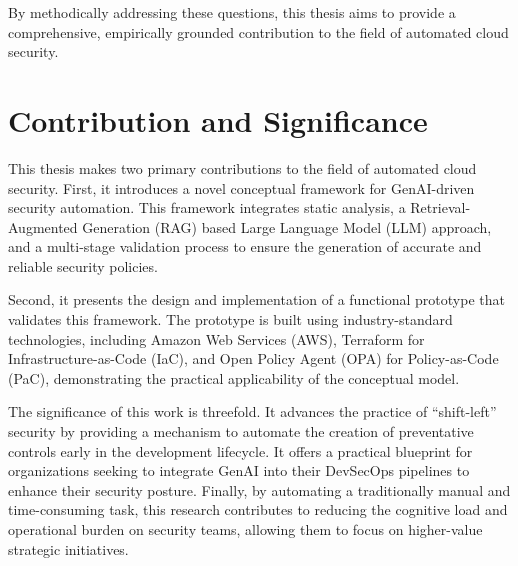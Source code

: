 By methodically addressing these questions, this thesis aims to provide a comprehensive, empirically grounded contribution to the field of automated cloud security.

\section{Contribution and Significance}
\label{sec:contribution}

This thesis makes two primary contributions to the field of automated cloud security. First, it introduces a novel conceptual framework for GenAI-driven security automation. This framework integrates static analysis, a Retrieval-Augmented Generation (RAG) based Large Language Model (LLM) approach, and a multi-stage validation process to ensure the generation of accurate and reliable security policies.

Second, it presents the design and implementation of a functional prototype that validates this framework. The prototype is built using industry-standard technologies, including Amazon Web Services (AWS), Terraform for Infrastructure-as-Code (IaC), and Open Policy Agent (OPA) for Policy-as-Code (PaC), demonstrating the practical applicability of the conceptual model.

The significance of this work is threefold. It advances the practice of ``shift-left'' security by providing a mechanism to automate the creation of preventative controls early in the development lifecycle. It offers a practical blueprint for organizations seeking to integrate GenAI into their DevSecOps pipelines to enhance their security posture. Finally, by automating a traditionally manual and time-consuming task, this research contributes to reducing the cognitive load and operational burden on security teams, allowing them to focus on higher-value strategic initiatives.

